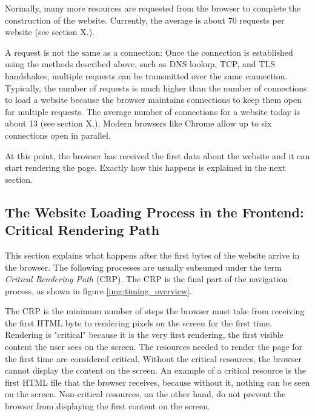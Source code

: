 Normally, many more resources are requested from the browser to complete the construction of the website.
Currently, the average is about 70 requests per website (see section X.). %

A request is not the same as a connection:
Once the connection is established using the methods described above, such as DNS lookup, TCP, and TLS handshakes, multiple requests can be transmitted over the same connection.
Typically, the number of requests is much higher than the number of connections to load a website because the browser maintains connections to keep them open for multiple requests.
The average number of connections for a website today is about 13 (see section X.). %
Modern browsers like Chrome allow up to six connections open in parallel. %



At this point, the browser has received the first data about the website and it can start rendering the page.
Exactly how this happens is explained in the next section.







\subsection{The Website Loading Process in the Frontend: Critical Rendering Path} %
\label{subsection:crp}

This section explains what happens after the first bytes of the website arrive in the browser.
The following processes are usually subsumed under the term \textit{Critical Rendering Path} (CRP).
The CRP is the final part of the navigation process, as shown in figure \ref{img:timing_overview}.



The CRP is the minimum number of steps the browser must take from receiving the first HTML byte to rendering pixels on the screen for the first time.
Rendering is "critical" because it is the very first rendering, the first visible content the user sees on the screen.
The resources needed to render the page for the first time are considered critical.
Without the critical resources, the browser cannot display the content on the screen.
An example of a critical resource is the first HTML file that the browser receives, because without it, nothing can be seen on the screen.
Non-critical resources, on the other hand, do not prevent the browser from displaying the first content on the screen. %


